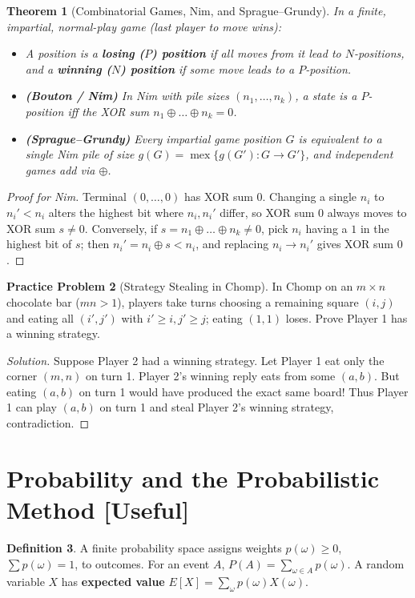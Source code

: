 \documentclass[11pt]{article}
\theoremstyle{plain}
\newtheorem{theorem}{Theorem}[section]
\theoremstyle{definition}
\newtheorem{definition}[theorem]{Definition}
\newtheorem{problem}[theorem]{Practice Problem}
\newenvironment{solution}{\begin{proof}[Solution]}{\end{proof}}
\begin{document}
\begin{theorem}[Combinatorial Games, Nim, and Sprague--Grundy]
In a finite, impartial, normal-play game (last player to move wins):
\begin{itemize}
\item A position is a \textbf{losing ($P$) position} if all moves from it lead to $N$-positions, and a \textbf{winning ($N$) position} if some move leads to a $P$-position.
\item \textbf{(Bouton / Nim)} In Nim with pile sizes $(n_1,\dots,n_k)$, a state is a $P$-position iff the XOR sum $n_1 \oplus \dots \oplus n_k = 0$.
\item \textbf{(Sprague--Grundy)} Every impartial game position $G$ is equivalent to a single Nim pile of size $g(G) = \operatorname{mex}\{g(G') : G \to G'\}$, and independent games add via $\oplus$.
\end{itemize}
\end{theorem}
\begin{proof}[Proof for Nim]
Terminal $(0,\dots,0)$ has XOR sum $0$. Changing a single $n_i$ to $n_i' < n_i$ alters the highest bit where $n_i, n_i'$ differ, so XOR sum $0$ always moves to XOR sum $s \ne 0$. Conversely, if $s = n_1 \oplus \dots \oplus n_k \ne 0$, pick $n_i$ having a $1$ in the highest bit of $s$; then $n_i' = n_i \oplus s < n_i$, and replacing $n_i \to n_i'$ gives XOR sum $0$.
\end{proof}

\begin{problem}[Strategy Stealing in Chomp]
In Chomp on an $m \times n$ chocolate bar ($mn > 1$), players take turns choosing a remaining square $(i,j)$ and eating all $(i',j')$ with $i'\ge i, j'\ge j$; eating $(1,1)$ loses. Prove Player 1 has a winning strategy.
\end{problem}
\begin{solution}
Suppose Player 2 had a winning strategy. Let Player 1 eat only the corner $(m,n)$ on turn 1. Player 2's winning reply eats from some $(a,b)$. But eating $(a,b)$ on turn 1 would have produced the exact same board! Thus Player 1 can play $(a,b)$ on turn 1 and steal Player 2's winning strategy, contradiction.
\end{solution}

\section{Probability and the Probabilistic Method [Useful]}

\begin{definition}
A finite probability space assigns weights $p(\omega)\ge0$, $\sum p(\omega)=1$,
to outcomes. For an event $A$, $P(A) = \sum_{\omega\in A}p(\omega)$. A random
variable $X$ has \textbf{expected value} $E[X] = \sum_\omega p(\omega)X(\omega)$.
\end{definition}
\end{document}
